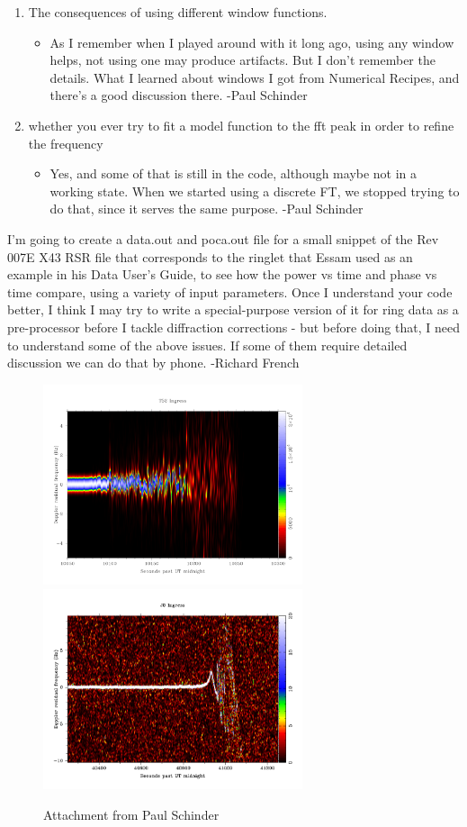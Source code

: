 \documentclass[crop=false,class=article,oneside]{standalone}
\begin{document}
\begin{enumerate}
\begin{itemize}
    \end{itemize}
    \item The consequences of using different window functions.
    \begin{itemize}
        \item As I remember when I played around with it long ago, using any window helps, not using one may produce artifacts.  But I don’t remember the details.  What I learned about windows I got from Numerical Recipes, and there’s a good discussion there. -Paul Schinder
    \end{itemize}
    \item whether you ever try to fit a model function to the fft peak in order to refine the frequency
    \begin{itemize}
        \item Yes, and some of that is still in the code, although maybe not in a working state.  When we started using a discrete FT, we stopped trying to do that, since it serves the same purpose. -Paul Schinder
    \end{itemize}
\end{enumerate}
I'm going to create a data.out and poca.out file for a small snippet of the Rev 007E X43 RSR file that corresponds to the ringlet that Essam used as an example in his Data User's Guide, to see how the power vs time and phase vs time compare, using a variety of input parameters. Once I understand your code better, I think I may try to write a special-purpose version of it for ring data as a pre-processor before I tackle diffraction corrections - but before doing that, I need to understand  some of the above issues. If some of them require detailed discussion we can do that by phone. -Richard French
\begin{figure}[H]
    \centering
    \captionsetup{type=figure}
    \includegraphics[page=1,width=3in]{non_copy.pdf}
    \hfill
    \includegraphics[width=3in]{non.png}
    \caption{Attachment from Paul Schinder}
\end{figure}
\end{document}
